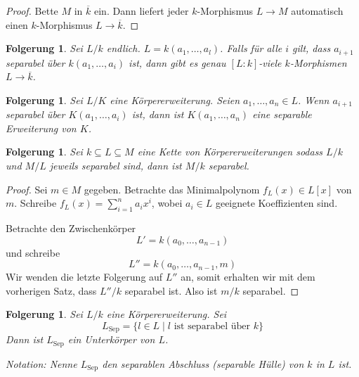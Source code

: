 \documentclass[a4paper,12pt,numbers=noenddot,parskip=full]{scrartcl}
\theoremstyle{dotless}
\newtheorem{corollary}[theorem]{Folgerung}
\theoremstyle{remark}
\begin{document}
	\begin{proof}
		Bette $M$ in $\overline{k}$ ein. Dann liefert jeder $k$-Morphismus $L \to M$ automatisch einen $k$-Morphismus $L \to \overline{k}$.
	\end{proof}

	\begin{corollary}
		Sei $L/k$ endlich. $L = k(a_1, \dots, a_l)$. Falls für alle $i$ gilt, dass $a_{i+1}$ separabel über $k(a_1, \dots, a_i)$ ist, dann gibt es genau $[L:k]$-viele $k$-Morphismen $L \to \overline{k}$.
	\end{corollary}

	\begin{corollary}
		Sei $L/K$ eine Körpererweiterung. Seien $a_1, \dots, a_n \in L$. Wenn $a_{i+1}$ separabel über $K(a_1, \dots, a_i)$ ist, dann ist $K(a_1, \dots, a_n)$ eine separable Erweiterung von $K$. 
	\end{corollary}

	\begin{corollary}
		Sei $k \subseteq L \subseteq M$ eine Kette von Körpererweiterungen sodass $L/k$ und $M/L$ jeweils separabel sind, dann ist $M/k$ separabel.
	\end{corollary}

	\begin{proof}
		Sei $m \in M$ gegeben. Betrachte das Minimalpolynom $f_L(x) \in L[x]$ von $m$. Schreibe $f_L(x) = \sum_{i=1}^n a_i x^i$, wobei $a_i \in L$ geeignete Koeffizienten sind.
		
		Betrachte den Zwischenkörper
		\begin{equation*}
			L' = k(a_0, \dots, a_{n-1})
		\end{equation*}
		und schreibe
		\begin{equation*}
			L'' = k(a_0, \dots, a_{n-1}, m)
		\end{equation*}
		Wir wenden die letzte Folgerung auf $L''$ an, somit erhalten wir mit dem vorherigen Satz, dass $L''/k$ separabel ist. Also ist $m/k$ separabel.
	\end{proof}

	\begin{corollary}
		Sei $L/k$ eine Körpererweiterung. Sei
		\begin{equation*}
			L_\text{Sep} = \{ l \in L \mid \text{$l$ ist separabel über $k$} \}
		\end{equation*}
		Dann ist $L_\text{Sep}$ ein Unterkörper von $L$.
		
		\textit{Notation:} Nenne $L_\text{Sep}$ den separablen Abschluss (separable Hülle) von $k$ in $L$ ist.
	\end{corollary}
\end{document}
